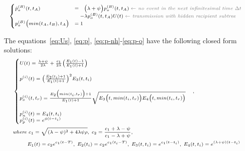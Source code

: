 \documentclass[a4paper,10pt]{article}
\begin{document}
\begin{equation}
\scriptsize
\begin{cases}
\dot{p}_o^{(B)}(t, t_A) &=~~  \Big(\lambda + \psi\Big) p_o^{(B)}(t, t_A)\; \textit{\color{gray} $\leftarrow$ no event in the next infinitesimal time $\Delta t$ }\\
    &~~~ - \lambda p_o^{(B)}(t, t_A)U(t)\;  \textit{\color{gray} $\leftarrow$ transmission with hidden recipient subtree}\\
p_o^{(B)}\Big(min(t_A, t_B), t_A\Big) &=  1\label{eq:p-o}
\end{cases}
\end{equation}


The equations~\ref{eq:Us}, \ref{eq:p}, \ref{eq:p-nh}-\ref{eq:p-o} have the following closed form solutions:
\begin{equation}
\scriptsize
\begin{split}
&\begin{cases}
U(t) = \frac{\lambda + \psi}{2\lambda} +  \frac{c_1}{2\lambda}\Big(\frac{E_1(t) - 1}{E_1(t) + 1}\Big)\\
\\
p^{(i)}(t) = \Big(\frac{E_2(t_i) + 1}{E_1(t) + 1}\Big)^2E_3(t, t_i) \\
\\
p_o^{(i)}(t, t_r) =  \frac{E_2\big(min(t_i, t_r)\big) + 1}{E_1(t) + 1}\sqrt{E_3\Big(t, min(t_i, t_r)\Big)E_4\Big(t, min(t_i, t_r)\Big)} \\
\\
p_n^{(i)}(t) =  E_4(t, t_i)
\\
p_p^{(i)}(t) =  e^{\phi (t -t_i)}
\end{cases},\\
& \textit{where } c_1 = \sqrt{(\lambda - \psi)^2 + 4 \lambda\psi\rho},\; c_2 = \frac{c_1 + \lambda - \psi}{c_1 - \lambda + \psi},\\
& ~~~~~~~~E_1(t) = c_2 e^{c_1 (t -T)},\; E_2(t_i) = c_2 e^{c_1 (t_i -T)},\; E_3(t, t_i) = e^{c_1 (t -t_i)}, \; E_4(t, t_i) =  e^{(\lambda + \psi) (t -t_i)}\\
\end{split}\label{eq:ps}
\end{equation}
\end{document}
